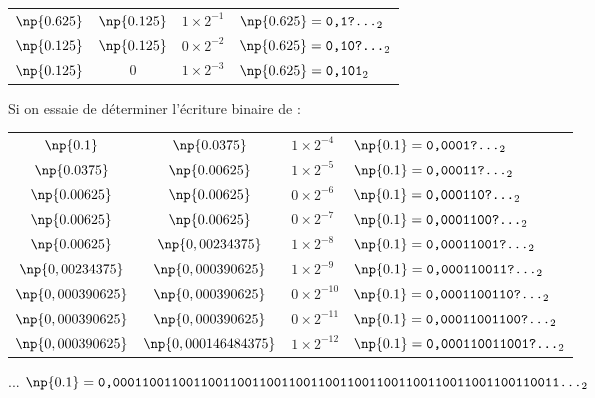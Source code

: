 \begin{tabular}{c@{\,$=$\,}c@{\,$+$\,}l@{\, donc : \,}l}
$\np{0.625}$ & $\np{0.125}$ & $1\times2^{-1}$ & $\np{0.625}= \texttt{0,1?...}_2$\\

$\np{0.125}$ & $\np{0.125}$ & $0\times2^{-2}$ & $\np{0.625}= \texttt{0,10?...}_2$\\

$\np{0.125}$ & $0$ & $1\times2^{-3}$ & $\np{0.625}= \texttt{0,101}_2$\\
\end{tabular}

Si on essaie de déterminer l'écriture binaire de  :

\begin{tabular}{c@{\,$=$\,}c@{\,$+$\,}l@{\, donc : \,}l}
$\np{0.1}$ & $\np{0.0375}$ & $1\times2^{-4}$ & $\np{0.1}= \texttt{0,0001?...}_2$\\

$\np{0.0375}$ & $\np{0.00625}$ & $1\times2^{-5}$ & $\np{0.1}= \texttt{0,00011?...}_2$\\

$\np{0.00625}$ & $\np{0.00625}$ & $0\times2^{-6}$ & $\np{0.1}= \texttt{0,000110?...}_2$\\

$\np{0.00625}$ & $\np{0.00625}$ & $0\times2^{-7}$ & $\np{0.1}= \texttt{0,0001100?...}_2$\\

$\np{0.00625}$ & $\np{0,00234375}$ & $1\times2^{-8}$ & $\np{0.1}= \texttt{0,00011001?...}_2$\\

$\np{0,00234375}$ & $\np{0,000390625}$ & $1\times2^{-9}$ & $\np{0.1}= \texttt{0,000110011?...}_2$\\

$\np{0,000390625}$ & $\np{0,000390625}$ & $0\times2^{-10}$ & $\np{0.1}= \texttt{0,0001100110?...}_2$\\

$\np{0,000390625}$ & $\np{0,000390625}$ & $0\times2^{-11}$ & $\np{0.1}= \texttt{0,00011001100?...}_2$\\

$\np{0,000390625}$ & $\np{0,000146484375}$ & $1\times2^{-12}$ & $\np{0.1}= \texttt{0,000110011001?...}_2$\\
\end{tabular}

... $\np{0.1}= \texttt{0,0001100110011001100110011001100110011001100110011001100110011...}_2$

